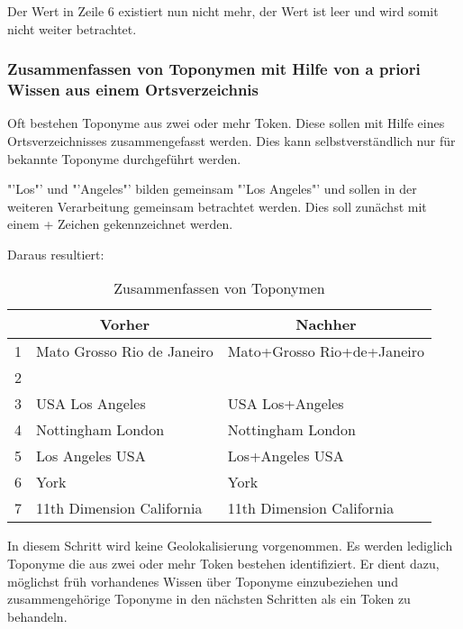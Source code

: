 				Der Wert in Zeile 6 existiert nun nicht mehr, der Wert ist leer und wird somit nicht weiter betrachtet.

			\subsubsection{Zusammenfassen von Toponymen mit Hilfe von a priori Wissen aus einem Ortsverzeichnis}

				Oft bestehen Toponyme aus zwei oder mehr Token.
				Diese sollen mit Hilfe eines Ortsverzeichnisses zusammengefasst werden. 
				Dies kann selbstverständlich nur für bekannte Toponyme durchgeführt werden.
				
				"'Los"' und "'Angeles"' bilden gemeinsam "'Los Angeles"' und sollen in der weiteren Verarbeitung gemeinsam betrachtet werden. 
				Dies soll zunächst mit einem + Zeichen gekennzeichnet werden.

				Daraus resultiert:

				\begin{table}[h]
				\centering
				\caption{Zusammenfassen von Toponymen}
				\label{tab:VorverarbeitungZusammen}
				\begin{tabular}{|l|l|l|}
				\hline
				  & \multicolumn{1}{c|}{\textbf{Vorher}} & \multicolumn{1}{c|}{\textbf{Nachher}} \\ \hline \hline
				1 & Mato Grosso Rio de Janeiro           & Mato+Grosso Rio+de+Janeiro            \\ \hline
				2 &                                      &                                       \\ \hline
				3 & USA Los Angeles                      & USA Los+Angeles                       \\ \hline
				4 & Nottingham London                    & Nottingham London                     \\ \hline
				5 & Los Angeles USA                      & Los+Angeles USA                       \\ \hline
				6 & York                                 & York                                  \\ \hline
				7 & 11th Dimension California            & 11th Dimension California             \\ \hline
				\end{tabular}
				\end{table}

				In diesem Schritt wird keine Geolokalisierung vorgenommen.
				Es werden lediglich Toponyme die aus zwei oder mehr Token bestehen identifiziert.
				Er dient dazu, möglichst früh vorhandenes Wissen über Toponyme einzubeziehen und zusammengehörige Toponyme in den nächsten Schritten als ein Token zu behandeln.


